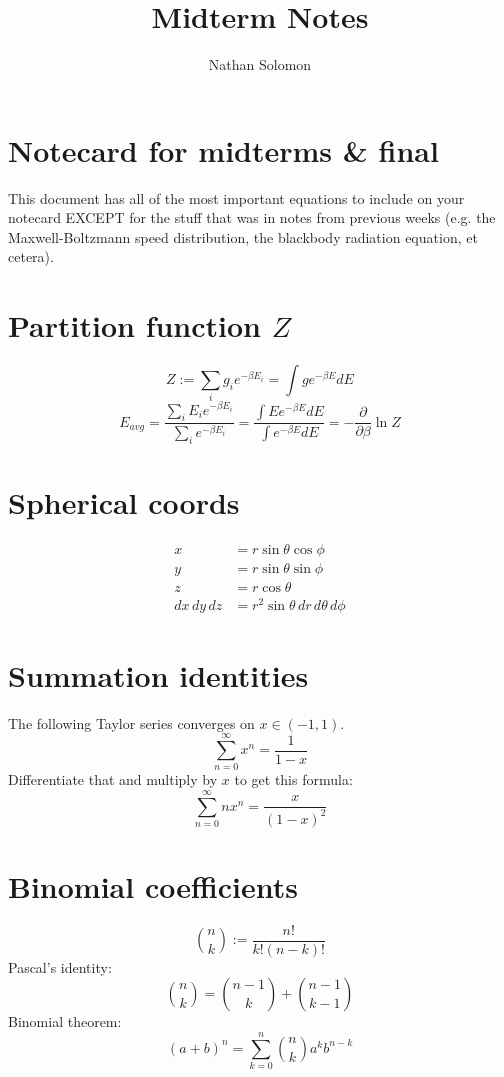 \documentclass[12pt]{article}
\begin{document}
\title{Midterm Notes}
\author{Nathan Solomon}
\maketitle

\section{Notecard for midterms \& final}
This document has all of the most important equations to include on your notecard EXCEPT for the stuff that was in notes from previous weeks (e.g. the Maxwell-Boltzmann speed distribution, the blackbody radiation equation, et cetera).

\section{Partition function $Z$}
\[ Z := \sum_i g_i e^{-\beta E_i} = \int g e^{- \beta E} dE \]
\[E_{avg} = \frac{\sum_i E_i e^{-\beta E_i}}{\sum_i e^{-\beta E_i}} = \frac{\int E e^{-\beta E} dE}{\int e^{-\beta E} dE}  = - \frac{\partial}{\partial \beta} \ln Z\]

\section{Spherical coords}
\begin{align*}
    x &= r \sin \theta \cos \phi \\
    y &= r \sin \theta \sin \phi \\
    z &= r \cos \theta \\
    dx \, dy \, dz &= r^2 \sin \theta \, dr \, d\theta \, d\phi
\end{align*}

\section{Summation identities}
The following Taylor series converges on $x \in (-1, 1)$.
\[\sum_{n=0}^\infty x^n = \frac{1}{1-x} \]
Differentiate that and multiply by $x$ to get this formula:
\[\sum_{n=0}^\infty nx^n = \frac{x}{(1-x)^2} \]

\section{Binomial coefficients}
\[ \binom{n}{k} := \frac{n!}{k! (n-k)!} \]
Pascal's identity:
\[\binom{n}{k} = \binom{n-1}{k} + \binom{n-1}{k-1}\]
Binomial theorem:
\[(a+b)^n = \sum_{k=0}^n \binom{n}{k} a^k b^{n-k}\]
\end{document}
